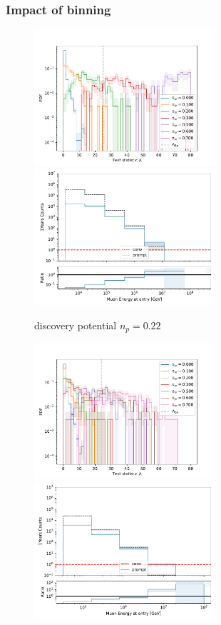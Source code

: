 \documentclass[aspectratio=1610, 9pt]{beamer}
\begin{document}
\begin{frame}
  \frametitle{Impact of binning}
  \begin{minipage}{0.49\textwidth}
    \begin{figure}
      \centering
      \includegraphics[width=0.6\textwidth]{../Plots/TS_Distribution_(3.5,8.5,8)}
      \includegraphics[width=0.6\textwidth]{../Plots/spectrum_(3.5,8.5,8)}
      \caption{discovery potential $n_p=0.22$}
    \end{figure}
  \end{minipage}
  \begin{minipage}{0.49\textwidth}
    \begin{figure}
      \centering
      \includegraphics[width=0.6\textwidth]{../Plots/TS_Distribution_(4.5,8,6)}
      \includegraphics[width=0.6\textwidth]{../Plots/spectrum_(4.5,8,6)}

\end{figure}
\end{minipage}
\end{frame}
\end{document}
